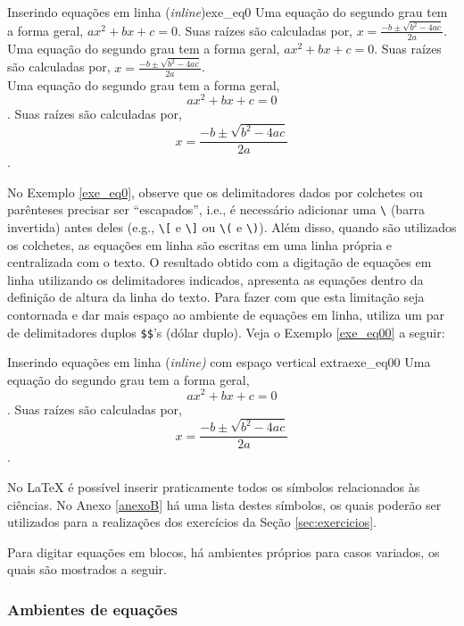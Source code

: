 \begin{texexptitled}[breakable,center lower,enhanced,middle=2mm]{Inserindo equações em linha (\textit{inline})}{exe_eq0}
Uma equação do segundo grau tem a forma geral, $ax^2 + bx + c =0$. Suas raízes são calculadas por, $x = \frac{-b \pm \sqrt{b^2 - 4ac}}{2a}$.
\\
Uma equação do segundo grau tem a forma geral, \(ax^2 + bx + c =0\). Suas raízes são calculadas por, \(x = \frac{-b \pm \sqrt{b^2 - 4ac}}{2a}\).
\\
Uma equação do segundo grau tem a forma geral, \[ax^2 + bx + c =0\]. Suas raízes são calculadas por, \[x = \frac{-b \pm \sqrt{b^2 - 4ac}}{2a}\].
\end{texexptitled}

No Exemplo \ref{exe_eq0}, observe que os delimitadores dados por colchetes ou parênteses precisar ser ``escapados'', i.e., é necessário adicionar uma \verb|\| (barra invertida) antes deles (e.g., \verb|\[| e \verb|\]| ou \verb|\(| e \verb|\)|). Além disso, quando são utilizados os colchetes, as equações em linha são escritas em uma linha própria e centralizada com o texto. O resultado obtido com a digitação de equações em linha utilizando os delimitadores indicados, apresenta as equações dentro da definição de altura da linha do texto. Para fazer com que esta limitação seja contornada e dar mais espaço ao ambiente de equações em linha, utiliza um par de delimitadores duplos \verb|$$|'s (dólar duplo). Veja o Exemplo \ref{exe_eq00} a seguir:

\begin{texexptitled}[breakable,center lower,enhanced,middle=2mm]{Inserindo equações em linha (\textit{inline)} com espaço vertical extra}{exe_eq00}
Uma equação do segundo grau tem a forma geral, $$ax^2 + bx + c =0$$. Suas raízes são calculadas por, $$x = \frac{-b \pm \sqrt{b^2 - 4ac}}{2a}$$.
\end{texexptitled}

No \LaTeX{} é possível inserir praticamente todos os símbolos relacionados às ciências. No Anexo \ref{anexoB} há uma lista destes símbolos, os quais poderão ser utilizados para a realizações dos exercícios da Seção \ref{sec:exercicios}.

Para digitar equações em blocos, há ambientes próprios para casos variados, os quais são mostrados a seguir.

\subsubsection*{Ambientes de equações}
\label{sec:amb_eqs}

